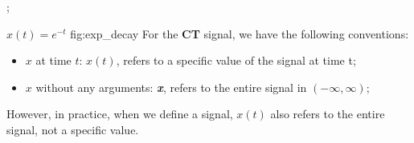             \inserttikzpicture
                {
                    \begin{axis}[
                        compat=1.17,
                        axis lines=middle,
                        xtick=\empty,  %
                        ytick=\empty,  %
                        ymin=-1,
                        ymax=8, 
                        xmin=-2.5,
                        xmax=5,
                        clip=false, 
                        xlabel=$t$,
                        xlabel style={
                            at={(ticklabel* cs:1.0)},
                            anchor=north,
                        },
                        ylabel={$x(t)$},
                        ylabel style={
                            at={(ticklabel* cs:1.0)},
                            anchor=east,
                            rotate=0,
                        },
                    ]
                    ;
                    \end{axis}
                } 
                {$x(t)=e^{-t}$}
                {fig:exp_decay}
        \noindent For the \textbf{CT} signal, we have the following conventions:
            \begin{itemize}
                \item $x$ at time $t$: $x(t)$, refers to a specific value of the signal at time t;
                \item $x$ without any arguments: \textbf{\emph{x}}, refers to the entire signal in $(-\infty, \infty)$;
            \end{itemize}
        However, in practice, when we define a signal, $x(t)$ also refers to the entire signal, not a specific value.

